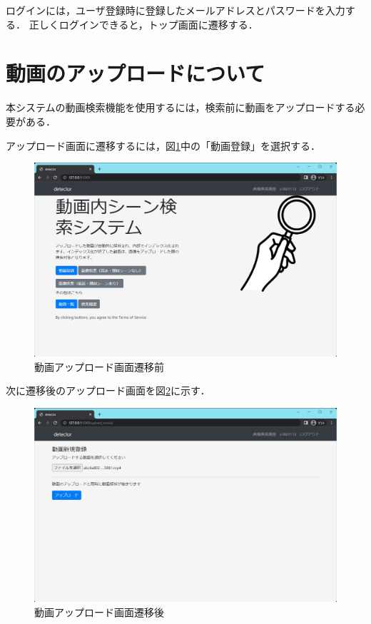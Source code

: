 \documentclass[a4j,12pt,dvipdfmx]{jreport}
\begin{document}
ログインには，ユーザ登録時に登録したメールアドレスとパスワードを入力する．
正しくログインできると，トップ画面に遷移する．

\section{動画のアップロードについて}
本システムの動画検索機能を使用するには，検索前に動画をアップロードする必要がある．

アップロード画面に遷移するには，図\ref{fig:index}中の「動画登録」を選択する．

\begin{figure}[b]
  \centering
  \includegraphics[width=13cm]{image/index.jpg}
  \caption{動画アップロード画面遷移前}
  \label{fig:index}
\end{figure}

次に遷移後のアップロード画面を図\ref{fig:movie_upload}に示す．

\begin{figure}[b]
  \centering
  \includegraphics[width=13cm]{image/movie_upload.jpg}
  \caption{動画アップロード画面遷移後}
  \label{fig:movie_upload}
\end{figure}
\end{document}
